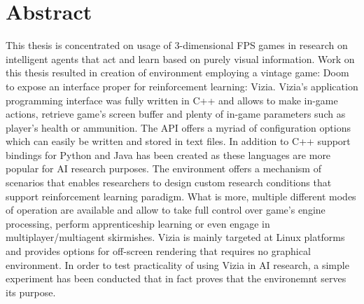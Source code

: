 \chapter*{Abstract}
This thesis is concentrated on usage of 3-dimensional FPS games in research on intelligent agents that act and learn based on purely visual information. Work on this thesis resulted in creation of environment employing a vintage game: Doom to expose an interface proper for reinforcement learning: Vizia. Vizia's application programming interface was fully written in C++ and allows to make in-game actions, retrieve game's screen buffer and plenty of in-game parameters such as player's health or ammunition. The API offers a myriad of configuration options which can easily be written and stored in text files. In addition to C++ support bindings for Python and Java has been created as these languages are more popular for AI research purposes. The environment offers a mechanism of scenarios that enables researchers to design custom research conditions that support reinforcement learning paradigm. What is more, multiple different modes of operation are available and allow to take full control over game's engine processing, perform apprenticeship learning or even engage in multiplayer/multiagent skirmishes. Vizia is mainly targeted at Linux platforms and provides options for off-screen rendering that requires no graphical environment. In order to test practicality of using Vizia in AI research, a simple experiment has been conducted that in fact proves that the environemnt serves its purpose.
